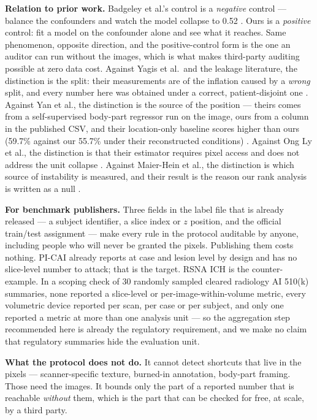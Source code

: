 \documentclass[11pt,a4paper]{article}
\begin{document}
\textbf{Relation to prior work.} Badgeley et al.'s control is a \emph{negative}
control --- balance the confounders and watch the model collapse to 0.52
\citep{badgeley2019hip}. Ours is a \emph{positive} control: fit a model on the
confounder alone and see what it reaches. Same phenomenon, opposite direction,
and the positive-control form is the one an auditor can run without the images,
which is what makes third-party auditing possible at zero data cost. Against
Yagis et al.\ and the leakage literature, the distinction is the split: their
measurements are of the inflation caused by a \emph{wrong} split, and every
number here was obtained under a correct, patient-disjoint one
\citep{yagis2021leakage,tampu2022leakage}. Against Yan et al., the distinction is the source of
the position --- theirs comes from a self-supervised body-part regressor run on
the image, ours from a column in the published CSV, and their location-only
baseline scores higher than ours (59.7\% against our 55.7\% under their
reconstructed conditions) \citep{yan2018deeplesiongraphs}. Against Ong Ly et al., the
distinction is that their estimator requires pixel access and does not address
the unit collapse \citep{ongly2024shortcut}. Against Maier-Hein et al., the distinction
is which source of instability is measured, and their result is the reason our
rank analysis is written as a null \citep{maierhein2018rankings}.

\textbf{For benchmark publishers.} Three fields in the label file that is already
released --- a subject identifier, a slice index or $z$ position, and the official
train/test assignment --- make every rule in the protocol auditable by anyone,
including people who will never be granted the pixels. Publishing them costs
nothing. PI-CAI already reports at case and lesion level by design and has no
slice-level number to attack; that is the target. RSNA ICH is the counter-example.
In a scoping check of 30 randomly sampled cleared radiology AI 510(k) summaries,
none reported a slice-level or per-image-within-volume metric, every volumetric
device reported per scan, per case or per subject, and only one reported a metric
at more than one analysis unit --- so the aggregation step recommended here is
already the regulatory requirement, and we make no claim that regulatory summaries
hide the evaluation unit.

\textbf{What the protocol does not do.} It cannot detect shortcuts that live in
the pixels --- scanner-specific texture, burned-in annotation, body-part framing.
Those need the images. It bounds only the part of a reported number that is
reachable \emph{without} them, which is the part that can be checked for free, at
scale, by a third party.
\end{document}
